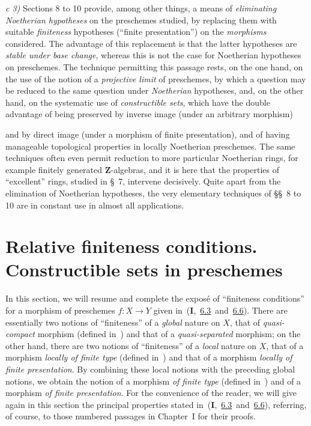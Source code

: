 \medskip
\noindent
\emph{c 3)} Sections 8 to 10 provide, among other things, a means of
\emph{eliminating Noetherian hypotheses} on the preschemes studied, by
replacing them with suitable \emph{finiteness} hypotheses (“finite
presentation”) on the \emph{morphisms} considered. The advantage of this
replacement is that the latter hypotheses are \emph{stable under base
change}, whereas this is not the case for Noetherian hypotheses on
preschemes. The technique permitting this passage rests, on the one hand, on
the use of the notion of a \emph{projective limit} of preschemes, by which a
question may be reduced to the same question under \emph{Noetherian}
hypotheses, and, on the other hand, on the systematic use of
\emph{constructible sets}, which have the double advantage of being
preserved by inverse image (under an arbitrary morphism)


and by direct image (under a morphism of finite presentation), and of having
manageable topological properties in locally Noetherian preschemes. The same
techniques often even permit reduction to more particular Noetherian rings,
for example finitely generated $\mathbf Z$-algebras, and it is here that the
properties of “excellent” rings, studied in §~7, intervene decisively.
Quite apart from the elimination of Noetherian hypotheses, the very
elementary techniques of §§~8 to 10 are in constant use in almost all
applications.

\setcounter{section}{0}

\section{Relative finiteness conditions. Constructible sets in preschemes}
\label{section:IV.1}

In this section, we will resume and complete the expos\'e of ``finiteness conditions'' for a morphism of preschemes $f:X\to Y$ given in~(\textbf{I},~\hyperref[subsection:I.6.3]{6.3}~and~\hyperref[subsection:I.6.6]{6.6}).
There are essentially two notions of ``finiteness'' of a \emph{global} nature on $X$, that of \emph{quasi-compact} morphism (defined in~) and that of a \emph{quasi-separated} morphism; on the other hand, there are two notions of ``finiteness'' of a \emph{local} nature on $X$, that of a morphism \emph{locally of finite type} (defined in~) and that of a morphism \emph{locally of finite presentation}.
By combining these local notions with the preceding global notions, we obtain the notion of a morphism \emph{of finite type} (defined in~) and of a morphism \emph{of finite presentation}.
For the convenience of the reader, we will give again in this section the principal properties stated in~(\textbf{I},~\hyperref[subsection:I.6.3]{6.3}~and~\hyperref[subsection:I.6.6]{6.6}), referring, of course, to those numbered passages in Chapter~I for their proofs.

